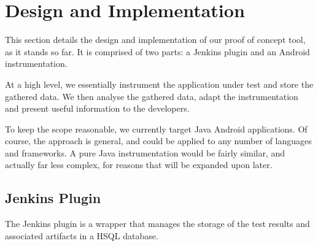 \section{Design and Implementation}
\label{sec:imp}


This section details the design and implementation of our proof of concept tool, as it stands so far. It is comprised of two parts: a Jenkins plugin and an Android instrumentation.

At a high level, we essentially instrument the application under test and store the gathered data. We then analyse the gathered data, adapt the instrumentation and present useful information to the developers.

To keep the scope reasonable, we currently target Java Android applications. Of course, the approach is general, and could be applied to any number of languages and frameworks. A pure Java instrumentation would be fairly similar, and actually far less complex, for reasons that will be expanded upon later.


\subsection{Jenkins Plugin}

The Jenkins plugin is a wrapper that manages the storage of the test results and associated artifacts in a HSQL database.


